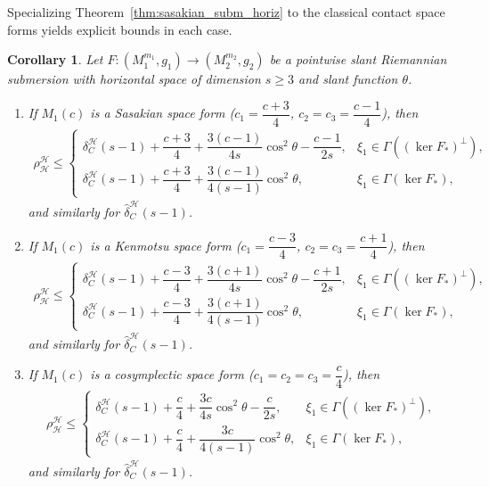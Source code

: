 \documentclass[11pt]{amsart}
\theoremstyle{plain}
\newtheorem{corollary}{Corollary}[section]
\theoremstyle{definition}
\theoremstyle{remark}
\begin{document}
Specializing Theorem~\ref{thm:sasakian_subm_horiz} to the classical
contact space forms yields explicit bounds in each case.
\begin{corollary}\label{cor:subm_horiz_sasakian}
Let $F:(M_1^{m_1},g_1)\to (M_2^{m_2},g_2)$ be a pointwise 
slant Riemannian submersion with horizontal space of dimension 
$s\ge 3$ and slant function $\theta$.

\begin{enumerate}
    \item If $M_1(c)$ is a Sasakian space form 
    ($c_1=\dfrac{c+3}{4}$, $c_2=c_3=\dfrac{c-1}{4}$), then
    \begin{align*}
    \rho_{\mathcal{H}}^{\mathcal{H}} \le 
    \begin{cases}
    \delta_C^{\mathcal{H}}(s-1) + \dfrac{c+3}{4} 
    + \dfrac{3(c-1)}{4s}\cos^2\theta 
    - \dfrac{c-1}{2s}, 
    & \xi_1 \in \Gamma((\ker F_*)^{\perp}),\\[8pt]
    \delta_C^{\mathcal{H}}(s-1) + \dfrac{c+3}{4} 
    + \dfrac{3(c-1)}{4(s-1)}\cos^2\theta,
    & \xi_1 \in \Gamma(\ker F_*),
    \end{cases}
    \end{align*}
    and similarly for $\hat{\delta}_C^{\mathcal{H}}(s-1)$.

    \item If $M_1(c)$ is a Kenmotsu space form 
    ($c_1=\dfrac{c-3}{4}$, $c_2=c_3=\dfrac{c+1}{4}$), then
    \begin{align*}
    \rho_{\mathcal{H}}^{\mathcal{H}} \le 
    \begin{cases}
    \delta_C^{\mathcal{H}}(s-1) + \dfrac{c-3}{4} 
    + \dfrac{3(c+1)}{4s}\cos^2\theta 
    - \dfrac{c+1}{2s}, 
    & \xi_1 \in \Gamma((\ker F_*)^{\perp}),\\[8pt]
    \delta_C^{\mathcal{H}}(s-1) + \dfrac{c-3}{4} 
    + \dfrac{3(c+1)}{4(s-1)}\cos^2\theta,
    & \xi_1 \in \Gamma(\ker F_*),
    \end{cases}
    \end{align*}
    and similarly for $\hat{\delta}_C^{\mathcal{H}}(s-1)$.

    \item If $M_1(c)$ is a cosymplectic space form 
    ($c_1=c_2=c_3=\dfrac{c}{4}$), then
    \begin{align*}
    \rho_{\mathcal{H}}^{\mathcal{H}} \le 
    \begin{cases}
    \delta_C^{\mathcal{H}}(s-1) + \dfrac{c}{4} 
    + \dfrac{3c}{4s}\cos^2\theta 
    - \dfrac{c}{2s}, 
    & \xi_1 \in \Gamma((\ker F_*)^{\perp}),\\[8pt]
    \delta_C^{\mathcal{H}}(s-1) + \dfrac{c}{4} 
    + \dfrac{3c}{4(s-1)}\cos^2\theta,
    & \xi_1 \in \Gamma(\ker F_*),
    \end{cases}
    \end{align*}
    and similarly for $\hat{\delta}_C^{\mathcal{H}}(s-1)$.


\end{enumerate}
\end{corollary}
\end{document}
